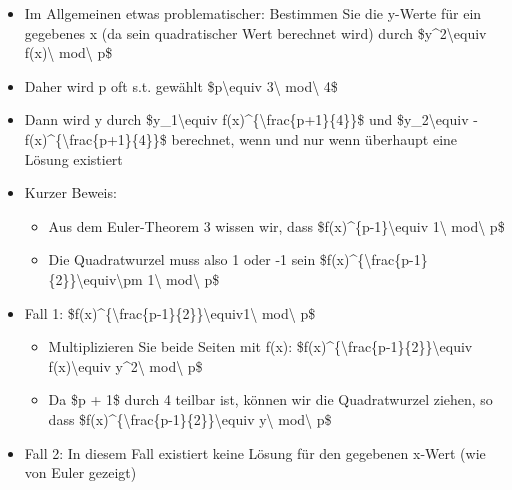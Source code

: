 \documentclass[a4paper]{article}
\begin{document}
\begin{multicols}{3}
    \begin{itemize}
        \item
              Im Allgemeinen etwas problematischer: Bestimmen Sie die y-Werte für
              ein gegebenes x (da sein quadratischer Wert berechnet wird) durch
              \$y\^{}2\textbackslash equiv f(x)\textbackslash{} mod\textbackslash{}
              p\$
        \item
              Daher wird p oft s.t. gewählt \$p\textbackslash equiv
              3\textbackslash{} mod\textbackslash{} 4\$
        \item
              Dann wird y durch \$y\_1\textbackslash equiv
              f(x)\^{}\{\textbackslash frac\{p+1\}\{4\}\}\$ und
              \$y\_2\textbackslash equiv
              -f(x)\^{}\{\textbackslash frac\{p+1\}\{4\}\}\$ berechnet, wenn und nur
              wenn überhaupt eine Lösung existiert
        \item
              Kurzer Beweis:

              \begin{itemize}
                  \item
                        Aus dem Euler-Theorem 3 wissen wir, dass
                        \$f(x)\^{}\{p-1\}\textbackslash equiv 1\textbackslash{}
                        mod\textbackslash{} p\$
                  \item
                        Die Quadratwurzel muss also 1 oder -1 sein
                        \$f(x)\^{}\{\textbackslash frac\{p-1\}\{2\}\}\textbackslash equiv\textbackslash pm
                        1\textbackslash{} mod\textbackslash{} p\$
              \end{itemize}
        \item
              Fall 1:
              \$f(x)\^{}\{\textbackslash frac\{p-1\}\{2\}\}\textbackslash equiv1\textbackslash{}
              mod\textbackslash{} p\$

              \begin{itemize}
                  \item
                        Multiplizieren Sie beide Seiten mit f(x):
                        \$f(x)\^{}\{\textbackslash frac\{p-1\}\{2\}\}\textbackslash equiv
                        f(x)\textbackslash equiv y\^{}2\textbackslash{} mod\textbackslash{}
                        p\$
                  \item
                        Da \$p + 1\$ durch 4 teilbar ist, können wir die Quadratwurzel
                        ziehen, so dass
                        \$f(x)\^{}\{\textbackslash frac\{p-1\}\{2\}\}\textbackslash equiv
                        y\textbackslash{} mod\textbackslash{} p\$
              \end{itemize}
        \item
              Fall 2: In diesem Fall existiert keine Lösung für den gegebenen x-Wert
              (wie von Euler gezeigt)
    \end{itemize}



\end{multicols}
\end{document}
